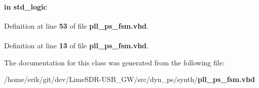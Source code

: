 \paragraph[{smpl\+\_\+cmp\+\_\+error}]{ {\bfseries \textcolor{keywordflow}{in}\textcolor{vhdlchar}{ }} {\bfseries \textcolor{comment}{std\+\_\+logic}\textcolor{vhdlchar}{ }} \hspace{0.3cm}{\ttfamily [Port]}}\label{classpll__ps__fsm_ab89caaf9e342c725af6f87ac27d615ef}


Definition at line {\bf 53} of file {\bf pll\+\_\+ps\+\_\+fsm.\+vhd}.

\paragraph[{std\+\_\+logic\+\_\+1164}]{\hspace{0.3cm}{\ttfamily [Package]}}\label{classpll__ps__fsm_acd03516902501cd1c7296a98e22c6fcb}


Definition at line {\bf 13} of file {\bf pll\+\_\+ps\+\_\+fsm.\+vhd}.



The documentation for this class was generated from the following file\+:\begin{DoxyCompactItemize}
\item 
/home/erik/git/dev/\+Lime\+S\+D\+R-\/\+U\+S\+B\+\_\+\+G\+W/src/dyn\+\_\+ps/synth/{\bf pll\+\_\+ps\+\_\+fsm.\+vhd}\end{DoxyCompactItemize}
